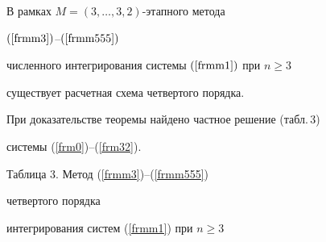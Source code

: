 \begin{thm}


В рамках $M=(3,\dotsc,3,2)$-этапного метода


$(\ref{frmm3})$--$(\ref{frmm555})$


численного интегрирования системы $(\ref{frmm1})$ при $n\geq 3$


существует расчетная схема четвертого порядка.


\end{thm}





При доказательстве теоремы найдено частное решение (табл.\,3)


системы (\ref{frm0})--(\ref{frm32}).


\smallskip





\begin{center}


Таблица 3. Метод (\ref{frmm3})--(\ref{frmm555})


четвертого порядка


интегрирования систем (\ref{frmm1}) при $n\geq 3$


\end{center}





